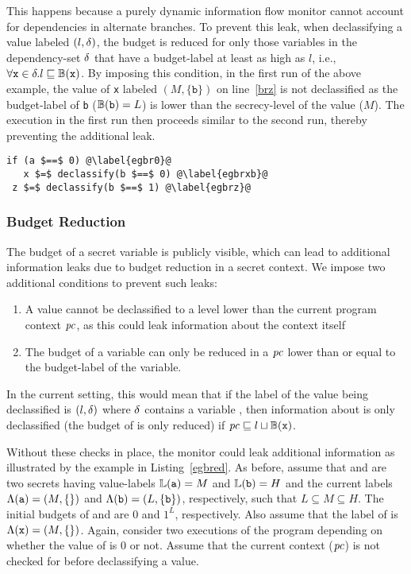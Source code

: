This happens because a purely dynamic information flow monitor
cannot account for dependencies in alternate branches. To prevent 
this leak, when declassifying a value labeled $(l, \delta)$, the 
budget is reduced for only those variables in the dependency-set 
$\delta$ that have a budget-label at least as high as $l$, i.e., 
$\forall \texttt{x} \in \delta. l \sqsubseteq \mathbb{B}(\texttt{x})$. 
By imposing this condition, in the first run of the above example, 
the value of \texttt{x} labeled $(M, \{\texttt{b}\})$ on line~\ref{brz} 
is not declassified as the budget-label of \texttt{b} 
($\mathbb{B}(\texttt{b}) = L$) is lower than the secrecy-level of the 
value ($M$). The execution in the first run then proceeds 
similar to the second run, thereby preventing the additional leak.  

\begin{lstlisting}[float,caption=Example to illustrate budget reduction,label=egbred]
 if (a $==$ 0) @\label{egbr0}@
   x $=$ declassify(b $==$ 0) @\label{egbrxb}@
 z $=$ declassify(b $==$ 1) @\label{egbrz}@
\end{lstlisting}
\subsubsection{\textbf{Budget Reduction}}
\label{aspect:br}
The budget of a secret variable is publicly visible, which can lead to
additional information leaks due to budget reduction in a secret context. 
We impose two additional conditions to prevent such leaks: 
\begin{enumerate}
\item A value cannot be declassified to a level lower than 
  the current program context $\mathit{pc}$, as this could leak information
  about the context itself
\item The budget of a variable can only be reduced in a $\mathit{pc}$ lower
  than or equal to the budget-label of the variable.
\end{enumerate} 
In the current setting, this would mean that if the 
label of the value being declassified is $(l, \delta)$ where $\delta$
contains a variable , then information about  is only
declassified (the budget of  is only reduced) if $\mathit{pc}
\sqsubseteq l \sqcup \mathbb{B}(\texttt{x})$. 

Without these checks in place, the monitor could leak additional
information as illustrated by the example in Listing~\ref{egbred}. 
As before, assume that  and  are two secrets having
value-labels $\mathbb{L}(\texttt{a}) = M$ and $\mathbb{L}(\texttt{b}) = H$ and the
current labels $\Lambda(\texttt{a}) = (M, \{\})$ and $\Lambda(\texttt{b}) = (L,
\{\texttt{b}\})$, respectively, such that $L \subseteq M \subseteq H$.   
The initial budgets of  and  are $0$ and $1^L$,
respectively. Also assume that the label of  is $\Lambda(\texttt{x})
= (M, \{\})$. Again, consider two executions of the program depending
on whether the value of  is $0$ or not. 
Assume that the current context ($\mathit{pc}$) 
is not checked for before declassifying a value. 

